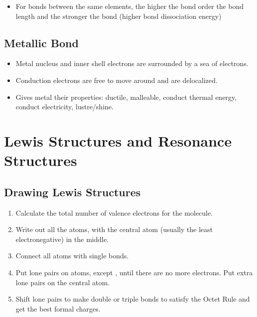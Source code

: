 \documentclass{article}
\begin{document}
\begin{itemize}
    \item For bonds between the same elements, the higher the bond order the bond length and the stronger the bond (higher bond dissociation energy)
\end{itemize}

\subsection{Metallic Bond}

\begin{itemize}
    \item Metal nucleus and inner shell electrons are surrounded by a sea of electrons.
    \item Conduction electrons are free to move around and are delocalized.
    \item Gives metal their properties: ductile, malleable, conduct thermal energy, conduct electricity, lustre/shine.
\end{itemize}

\section{Lewis Structures and Resonance Structures}

\subsection{Drawing Lewis Structures}

\begin{enumerate}
    \item Calculate the total number of valence electrons for the molecule.
    \item Write out all the atoms, with the central atom (usually the least electronegative) in the middle.
    \item Connect all atoms with single bonds.
    \item Put lone pairs on atoms, except , until there are no more electrons. Put extra lone pairs on the central atom.
    \item Shift lone pairs to make double or triple bonds to satisfy the Octet Rule and get the best formal charges.
\end{enumerate}
\end{document}
